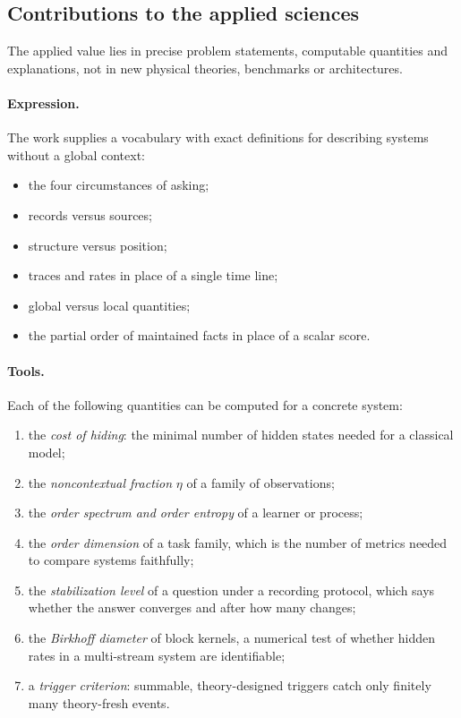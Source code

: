 \documentclass[11pt]{article}
\theoremstyle{definition}
\theoremstyle{remark}
\begin{document}
\subsection{Contributions to the applied sciences}
The applied value lies in precise problem statements, computable quantities and explanations, not in new physical theories, benchmarks or architectures.

\paragraph{Expression.} The work supplies a vocabulary with exact definitions for describing systems without a global context:
\begin{itemize}
\item the four circumstances of asking;
\item records versus sources;
\item structure versus position;
\item traces and rates in place of a single time line;
\item global versus local quantities;
\item the partial order of maintained facts in place of a scalar score.
\end{itemize}

\paragraph{Tools.} Each of the following quantities can be computed for a concrete system:
\begin{enumerate}
\item the \emph{cost of hiding}: the minimal number of hidden states needed for a classical model;
\item the \emph{noncontextual fraction} $\eta$ of a family of observations;
\item the \emph{order spectrum and order entropy} of a learner or process;
\item the \emph{order dimension} of a task family, which is the number of metrics needed to compare systems faithfully;
\item the \emph{stabilization level} of a question under a recording protocol, which says whether the answer converges and after how many changes;
\item the \emph{Birkhoff diameter} of block kernels, a numerical test of whether hidden rates in a multi-stream system are identifiable;
\item a \emph{trigger criterion}: summable, theory-designed triggers catch only finitely many theory-fresh events.
\end{enumerate}
\end{document}
